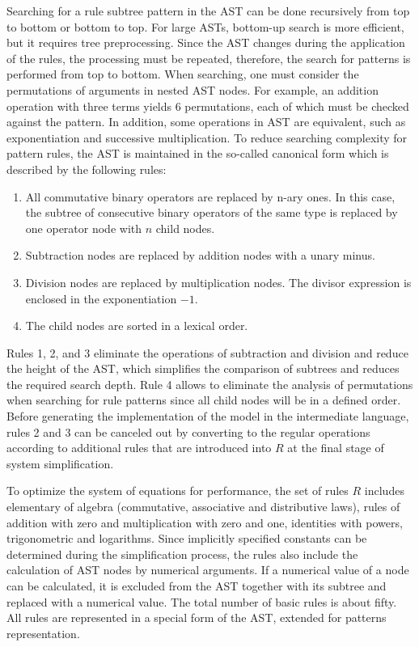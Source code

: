 \documentclass[lettersize,journal]{IEEEtran}
\begin{document}
Searching for a rule subtree pattern in the AST can be done recursively from top to bottom or bottom to top. For large ASTs, bottom-up search is more efficient, 
but it requires tree preprocessing. Since the AST changes during the application of the rules, the processing must be repeated, therefore, 
the search for patterns is performed from top to bottom. When searching, one must consider the permutations of arguments in nested 
AST nodes. For example, an addition operation with three terms yields 6 permutations, each of which must be checked against the pattern. 
In addition, some operations in AST are equivalent, such as exponentiation and successive multiplication. 
To reduce searching complexity for pattern rules, the AST is maintained in the so-called canonical form which is described by the following rules:

\begin{enumerate}
	\item All commutative binary operators are replaced by n-ary ones. In this case, the subtree of consecutive binary operators of the same type is replaced by one operator node with \(n\) child nodes.
	\item Subtraction nodes are replaced by addition nodes with a unary minus.
	\item Division nodes are replaced by multiplication nodes. The divisor expression is enclosed in the exponentiation \(-1\).
	\item The child nodes are sorted in a lexical order.
\end{enumerate}

Rules 1, 2, and 3 eliminate the operations of subtraction and division and reduce the height of the AST, which simplifies the comparison of subtrees 
and reduces the required search depth. Rule 4 allows to eliminate the analysis of permutations when searching for rule patterns since all child 
nodes will be in a defined order. Before generating the implementation of the model in the intermediate language, rules 2 and 3 can be canceled out by
converting to the regular operations according to additional rules that are introduced into \(R\) at the final stage of system simplification.

To optimize the system of equations for performance, the set of rules \(R\) includes elementary of algebra (commutative, associative and distributive laws), 
rules of addition with zero and multiplication with zero and one, identities with powers, trigonometric and logarithms. 
Since implicitly specified constants can be determined during the simplification process, the rules also include the calculation of AST nodes by numerical
arguments. If a numerical value of a node can be calculated, it is excluded from the AST together with its subtree and replaced with a numerical value. 
The total number of basic rules is about fifty. All rules are represented in a special form of the AST, extended
for patterns representation.
\end{document}
